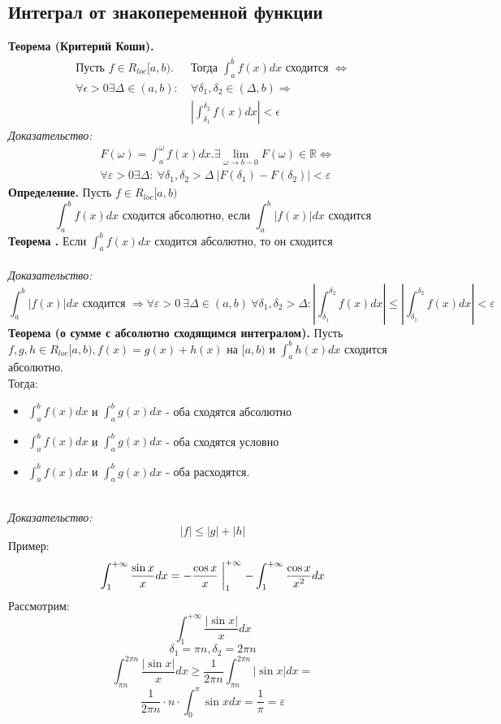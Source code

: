 \documentclass{article}
\newcommand*{\theorem}[2]{\textbf{Теорема #1. } #2 \newline}
\newcommand*{\definition}[1]{\textbf{Определение.} #1 \newline}
\newcommand*{\R}{\mathbb{R}}
\begin{document}
\subsection{Интеграл от знакопеременной функции}
\theorem{(Критерий Коши)}{
    \begin{align*}
        \text{Пусть }f \in R_{loc}[a, b). &\text{Тогда }\int_{a}^{\bar{b}} f(x)dx \text{ сходится } \Leftrightarrow\\
        \forall \epsilon > 0 \exists \Delta \in (a, b):\  &\forall \delta_1, \delta_2 \in (\Delta, b) \Rightarrow\\
        &\left|\int_{\delta_1}^{\delta_2} f(x)dx\right| < \epsilon
    \end{align*}
}
\textit{Доказательство: \\}
\begin{align*}
    &F(\omega) = \int_{a}^{\omega} f(x)dx. \exists \displaystyle \lim_{\omega \to b - 0} F(\omega) \in \R \Leftrightarrow\\
    &\forall \varepsilon > 0 \exists \Delta:\ \forall \delta_1, \delta_2 > \Delta\ |F(\delta_1) - F(\delta_2)| < \varepsilon
\end{align*}
\definition{Пусть $f \in R_{loc}[a, b)$
    $$
        \int_{a}^{b} f(x)dx \text{ сходится абсолютно, если } \int_{a}^{b} |f(x)|dx \text{ сходится}
    $$
}
\theorem{}{}
Если $\int_{a}^{b} f(x)dx$ сходится абсолютно, то он сходится\\\\
\textit{Доказательство: }
$$
    \int_{a}^{b}|f(x)|dx \text{ сходится } \Rightarrow \forall \varepsilon > 0\  \exists \Delta \in (a, b)\ \forall \delta_1, \delta_2 > \Delta: \left|\int_{\delta_1}^{\delta_2}f(x)dx\right| \leq \left|\int_{\delta_1}^{\delta_2} f(x)dx\right| < \varepsilon
$$
\theorem{(о сумме с абсолютно сходящимся интегралом)}{}
Пусть $f, g, h \in R_{loc}[a, b), f(x) = g(x) + h(x)$ на $[a, b)$ и $\int_{a}^{b}h(x)dx$ сходится абсолютно.\\ 
Тогда:
\begin{itemize}
    \item $\int_{a}^{b}f(x)dx$ и $\int_{a}^{b}g(x)dx$ - оба сходятся абсолютно\\
    \item $\int_{a}^{b}f(x)dx$ и $\int_{a}^{b}g(x)dx$ - оба сходятся условно\\
    \item $\int_{a}^{b}f(x)dx$ и $\int_{a}^{b}g(x)dx$ - оба расходятся.\\\\
\end{itemize}
\textit{Доказательство: \\}
$$
    |f| \leq |g| + |h|
$$
Пример: 
$$
    \int_{1}^{+\infty}\frac{\sin x}{x}dx = -\frac{\cos x}{x}\biggm\vert_{1}^{+\infty} - \int_{1}^{+\infty} \frac{\cos x}{x^2} dx
$$
Рассмотрим: 
$$ 
    \int_{1}^{+\infty} \frac{|\sin x|}{x}dx
$$
$$
    \delta_1 = \pi n, \delta_2 = 2\pi n
$$
$$
    \int_{\pi n}^{2 \pi n} \frac{|\sin x|}{x}dx \geq \frac{1}{2 \pi n} \int_{\pi n}^{2 \pi n}|\sin x|dx =
$$
$$
    \frac{1}{2 \pi n} \cdot n \cdot \int_{0}^{\pi} \sin x dx = \frac{1}{\pi} = \varepsilon
$$
\end{document}
